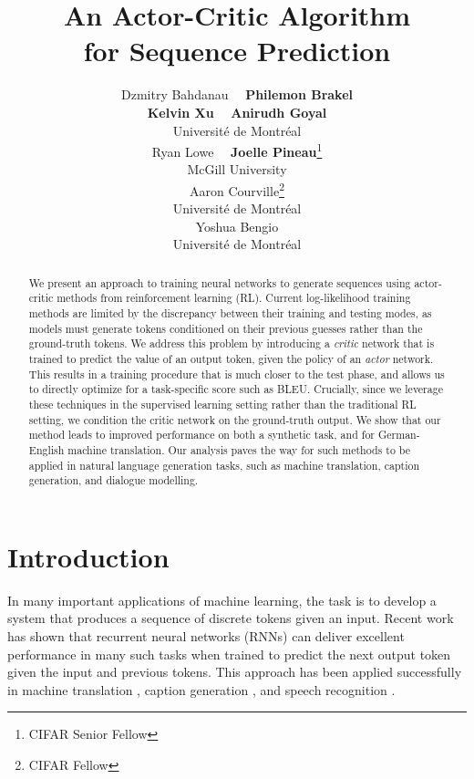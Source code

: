 \documentclass{article} \usepackage{iclr2017_conference,times}
\title{An Actor-Critic Algorithm\\
       for Sequence Prediction}
\author{Dzmitry Bahdanau~  ~\textbf{Philemon Brakel} \\ 
        \textbf{Kelvin Xu}~ ~\textbf{Anirudh Goyal} \\ 
        Universit\'e de Montr\'eal \\
        \And
        Ryan Lowe~ ~\textbf{Joelle Pineau}\thanks{CIFAR Senior Fellow} \\
        McGill University \\
        \AND
        Aaron Courville\thanks{CIFAR Fellow}\\
        Universit\'e de Montr\'eal \\
        \And
        \hspace{52mm}Yoshua Bengio\footnotemark[1] \\
        \hspace{52mm}Universit\'e de Montr\'eal
}
\begin{document}
\maketitle

\begin{abstract}
    We present an approach to training neural networks to generate sequences using actor-critic methods from reinforcement learning (RL).
    Current log-likelihood training methods are limited by the discrepancy between their training and testing modes, 
    as models must generate tokens conditioned on their previous guesses rather
    than the ground-truth tokens. 
    We address this problem by introducing a \textit{critic} network that is trained to predict the value of an output token, given the policy of an \textit{actor} network.
    This results in a training procedure that is much closer to the test phase, and allows us to directly optimize for a task-specific score such as BLEU.
    Crucially, since we leverage these techniques in the supervised learning
    setting rather than the traditional RL setting, we condition the critic
    network on the ground-truth output.
    We show that our method leads to improved performance on both a synthetic task, and for German-English machine translation.
 Our analysis paves the way for such methods to be applied in natural 
 language generation tasks, such as machine translation, caption generation, and dialogue modelling.
\end{abstract}

\section{Introduction}

In many important applications of machine learning, the task is to develop a
system that produces a sequence of discrete tokens given an input. Recent work
has shown that recurrent neural networks (RNNs) can deliver excellent
performance in many such tasks when trained to predict the next output token
given the input and previous tokens. This approach has been applied successfully in machine translation
\citep{sutskever2014sequence,bahdanau2015neural}, caption generation
\citep{kiros2014unifying,donahue2015long,vinyals2015show,xu2015show,karpathy2015deep}, and speech recognition 
\citep{chorowski2015attention,chan2015listen}. 
\end{document}
